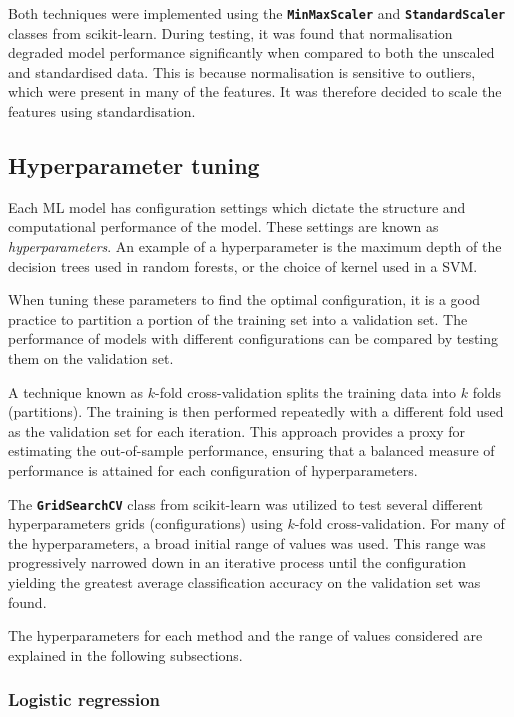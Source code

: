 Both techniques were implemented using the \texttt{\textbf{MinMaxScaler}} and \texttt{\textbf{StandardScaler}} classes from scikit-learn. During testing, it was found that normalisation degraded model performance significantly when compared to both the unscaled and standardised data. This is because normalisation is sensitive to outliers, which were present in many of the features. It was therefore decided to scale the features using standardisation. 

\subsection{Hyperparameter tuning}

Each ML model has configuration settings which dictate the structure and computational performance of the model. These settings are known as \textit{hyperparameters}. An example of a hyperparameter is the maximum depth of the decision trees used in random forests, or the choice of kernel used in a SVM.

When tuning these parameters to find the optimal configuration, it is a good practice to partition a portion of the training set into a validation set. The performance of models with different configurations can be compared by testing them on the validation set.

A technique known as $k$-fold cross-validation splits the training data into $k$ folds (partitions). The training is then performed repeatedly with a different fold used as the validation set for each iteration. This approach provides a proxy for estimating the out-of-sample performance, ensuring that a balanced measure of performance is attained for each configuration of hyperparameters.

The \texttt{\textbf{GridSearchCV}} class from scikit-learn was utilized to test several different hyperparameters grids (configurations) using $k$-fold cross-validation. For many of the hyperparameters, a broad initial range of values was used. This range was progressively narrowed down in an iterative process until the configuration yielding the greatest average classification accuracy on the validation set was found.

The hyperparameters for each method and the range of values considered are explained in the following subsections.

\subsubsection{Logistic regression}

